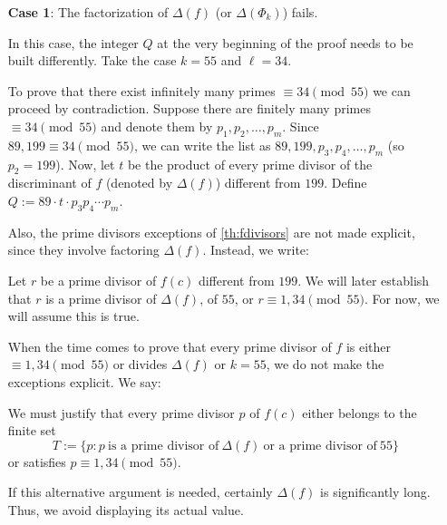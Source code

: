 \documentclass[../main.tex]{subfiles}
\begin{document}
\begin{enumerate}[align=left]
	\item[\textbf{Case 1}:] The factorization of $\Delta(f)$ (or $\Delta(\Phi_k)$) fails.
	
	In this case, the integer $Q$ at the very beginning of the proof needs to be built differently. Take the case $k=55$ and $\ell=34$.\\
	
	\begin{mdframed}\small
	To prove that there exist infinitely many primes $\equiv 34 \pmod{55}$ we can proceed by contradiction. Suppose there are finitely many primes $\equiv 34\pmod{55}$ and denote them by $p_1, p_2,\dots,p_m$. Since $89, 199 \equiv 34 \pmod{55}$, we can write the list as $89, 199, p_{3},p_{4},\dots, p_m$ (so $p_{2}=199$). Now, let $t$ be the product of every prime divisor of the discriminant of $f$ (denoted by $\Delta(f)$) different from $199$. Define $Q:=89\cdot t\cdot p_{3}p_{4}\cdots p_m$.
	\end{mdframed}
	
	Also, the prime divisors exceptions of \cref{th:fdivisors} are not made explicit, since they involve factoring $\Delta(f)$. Instead, we write:\\
	
	\begin{mdframed}\small
	Let $r$ be a prime divisor of $f(c)$ different from $199$. We will later establish that $r$ is a prime divisor of $\Delta(f)$, of $55$, or $r\equiv 1,34\pmod{55}$. For now, we will assume this is true.
	\end{mdframed}
	
	When the time comes to prove that every prime divisor of $f$ is either $\equiv 1, 34\pmod{55}$ or divides $\Delta(f)$ or $k=55$, we do not make the exceptions explicit. We say:\\
	
	\begin{mdframed}\small
	We must justify that every prime divisor $p$ of $f(c)$ either belongs to the finite set 
		\begin{equation*}	
		T:=\{p: p \ \text{is a prime divisor of} \ \Delta(f) \ \text{or a prime divisor of} \ 55\}
		\end{equation*}
	or satisfies $p\equiv 1,34\pmod{55}$.
	\end{mdframed}
	
	If this alternative argument is needed, certainly $\Delta(f)$ is significantly long. Thus, we avoid displaying its actual value.
	

\end{enumerate}
\end{document}

